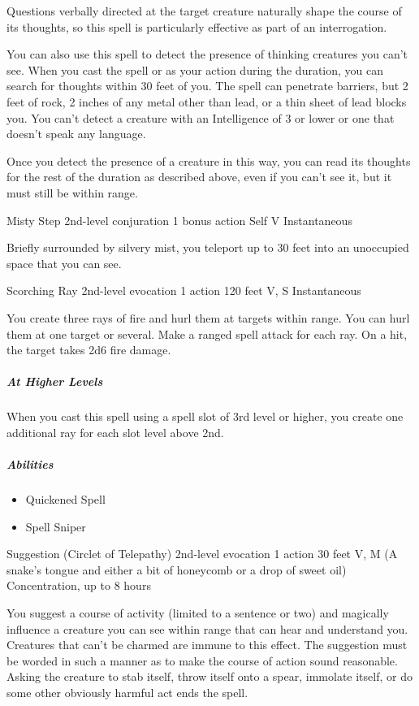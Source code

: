 \documentclass[a4paper,openany,twocolumn]{book}
\begin{document}
Questions verbally directed at the target creature naturally shape the course of its thoughts, so this spell is particularly effective as part of an interrogation.

You can also use this spell to detect the presence of thinking creatures you can’t see. When you cast the spell or as your action during the duration, you can search for thoughts within 30 feet of you. The spell can penetrate barriers, but 2 feet of rock, 2 inches of any metal other than lead, or a thin sheet of lead blocks you. You can’t detect a creature with an Intelligence of 3 or lower or one that doesn’t speak any language.

Once you detect the presence of a creature in this way, you can read its thoughts for the rest of the duration as described above, even if you can’t see it, but it must still be within range.

\DndSpellHeader
  {Misty Step}
  {2nd-level conjuration}
  {1 bonus action}
  {Self}
  {V}
  {Instantaneous}

Briefly surrounded by silvery mist, you teleport up to 30 feet into an unoccupied space that you can see.

\DndSpellHeader
  {Scorching Ray}
  {2nd-level evocation}
  {1 action}
  {120 feet}
  {V, S}
  {Instantaneous}

You create three rays of fire and hurl them at targets within range. You can hurl them at one target or several. Make a ranged spell attack for each ray. On a hit, the target takes 2d6 fire damage.
    
\subparagraph*{At Higher Levels} When you cast this spell using a spell slot of 3rd level or higher, you create one additional ray for each slot level above 2nd.

\subparagraph*{Abilities}
\begin{itemize}
  \item Quickened Spell
  \item Spell Sniper
\end{itemize}

\DndSpellHeader
  {Suggestion (Circlet of Telepathy)}
  {2nd-level evocation}
  {1 action}
  {30 feet}
  {V, M (A snake's tongue and either a bit of honeycomb or a drop of sweet oil)}
  {Concentration, up to 8 hours}

You suggest a course of activity (limited to a sentence or two) and magically influence a creature you can see within range that can hear and understand you. Creatures that can’t be charmed are immune to this effect. The suggestion must be worded in such a manner as to make the course of action sound reasonable. Asking the creature to stab itself, throw itself onto a spear, immolate itself, or do some other obviously harmful act ends the spell.
\end{document}
